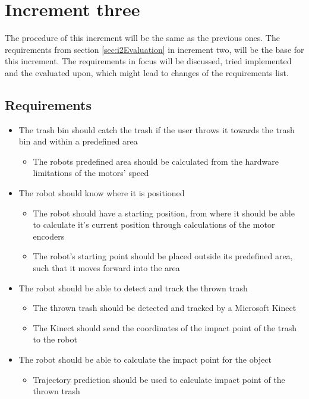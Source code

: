 \chapter{Increment three}
\label{chap:Increment three}
The procedure of this increment will be the same as the previous ones. The requirements from section \ref{sec:i2Evaluation} in increment two, will be the base for this increment. The requirements in focus will be discussed, tried implemented and the evaluated upon, which might lead to changes of the requirements list. 

\section{Requirements}
\label{sec:i3Requirements}

\begin{itemize}
	\item The trash bin should catch the trash if the user throws it towards the trash bin and within a predefined area
	\begin{itemize}
		\item {The robots predefined area should be calculated from the hardware limitations of the motors’ speed}
	\end{itemize}
	\item The robot should know where it is positioned
	\begin{itemize}
		\item {The robot should have a starting position, from where it should be able to calculate it's current position through calculations of the motor encoders}
		\item {The robot's starting point should be placed outside its predefined area, such that it moves forward into the area}
	\end{itemize}
	\item The robot should be able to detect and track the thrown trash
	\begin{itemize}
		\item {The thrown trash should be detected and tracked by a Microsoft Kinect}
		\item {The Kinect should send the coordinates of the impact point of the trash to the robot}
	\end{itemize}
	\item The robot should be able to calculate the impact point for the object
	\begin{itemize}
		\item {Trajectory prediction should be used to calculate impact point of the thrown trash}

\end{itemize}
\end{itemize}
